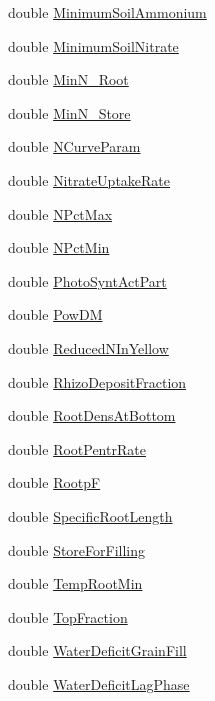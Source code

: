 \begin{DoxyCompactItemize}
\item 
double \hyperlink{classcrop_af11b53bf326f21dc1628289175ecb6d7}{MinimumSoilAmmonium}
\item 
double \hyperlink{classcrop_af1ec4e9a12abd41e5f5b39c87cfc2349}{MinimumSoilNitrate}
\item 
double \hyperlink{classcrop_a4ec1369c2adcd701d7c4676fce24310c}{MinN\_\-Root}
\item 
double \hyperlink{classcrop_a3a411cb751e18aaf088d266ee47c9420}{MinN\_\-Store}
\item 
double \hyperlink{classcrop_ad789899ed1b1f807e992d207dceaa192}{NCurveParam}
\item 
double \hyperlink{classcrop_a0cbba1c8f072c0ae99c9465f5eadf2cb}{NitrateUptakeRate}
\item 
double \hyperlink{classcrop_ab71cf78ab9ac2779deeb032e7b36e47d}{NPctMax}
\item 
double \hyperlink{classcrop_a64b16d0f5b047dbd1c1fcdde7fd09a87}{NPctMin}
\item 
double \hyperlink{classcrop_a23c5f9e6bead96515b31e977405637d8}{PhotoSyntActPart}
\item 
double \hyperlink{classcrop_a69df1a97a358dff8c354b08cb93908ec}{PowDM}
\item 
double \hyperlink{classcrop_a0bbe1011a2b6d4224bd986f26d5a1d39}{ReducedNInYellow}
\item 
double \hyperlink{classcrop_a252ade240154c71d644732abc9304f79}{RhizoDepositFraction}
\item 
double \hyperlink{classcrop_a3bd248dac15a2aefd7289240ffeeb879}{RootDensAtBottom}
\item 
double \hyperlink{classcrop_ac3e7efec04f1437634c82c1c3d045924}{RootPentrRate}
\item 
double \hyperlink{classcrop_a6ea7c6dccd7cf399d9276d0328c142cb}{RootpF}
\item 
double \hyperlink{classcrop_a56cef92be3d0cb8376b13f1666c469e2}{SpecificRootLength}
\item 
double \hyperlink{classcrop_adf0da70c2a7dc063b5bcb09730e155c6}{StoreForFilling}
\item 
double \hyperlink{classcrop_aab8805ada2711ddb5996d9e87376eb21}{TempRootMin}
\item 
double \hyperlink{classcrop_a158a4f00952108fdc19727bdc90765f9}{TopFraction}
\item 
double \hyperlink{classcrop_abcc0955968163247c126f91191a4c782}{WaterDeficitGrainFill}
\item 
double \hyperlink{classcrop_a4a332805f2e6027e5e2e18e2bf7cae17}{WaterDeficitLagPhase}

\end{DoxyCompactItemize}
